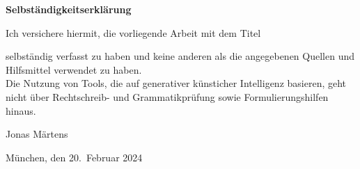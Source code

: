 \thispagestyle{empty}
\vspace*{1cm}
{\huge \textbf{Selbständigkeitserklärung}}\\
\vspace*{1.5cm}

Ich versichere hiermit, die vorliegende Arbeit mit dem Titel

\begin{center}
    \textbf{\theTitle}
\end{center}

selbständig verfasst zu haben und keine anderen als die angegebenen Quellen und Hilfsmittel verwendet zu haben.
\\
Die Nutzung von Tools, die auf generativer künsticher Intelligenz basieren, geht nicht über Rechtschreib- und Grammatikprüfung sowie Formulierungshilfen hinaus.

\vspace*{3cm}

Jonas Märtens

\vspace*{1cm}
München, den 20.~Februar 2024
